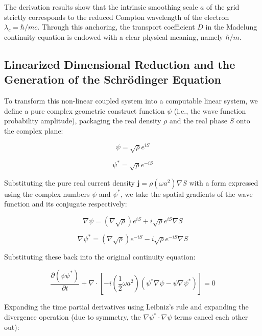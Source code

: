 \documentclass[12pt, a4paper]{article}
\begin{document}
The derivation results show that the intrinsic smoothing scale $a$ of the grid strictly corresponds to the reduced Compton wavelength of the electron $\lambda_c = \hbar/mc$. Through this anchoring, the transport coefficient $D$ in the Madelung continuity equation is endowed with a clear physical meaning, namely $\hbar/m$.

\subsection{Linearized Dimensional Reduction and the Generation of the Schrödinger Equation}

To transform this non-linear coupled system into a computable linear system, we define a pure complex geometric construct function $\psi$ (i.e., the wave function probability amplitude), packaging the real density $\rho$ and the real phase $S$ onto the complex plane:

\begin{equation}
\psi = \sqrt{\rho} e^{iS} 
\end{equation}

\begin{equation}
\psi^* = \sqrt{\rho} e^{-iS} 
\end{equation}

Substituting the pure real current density $\mathbf{j} = \rho (\omega a^2) \nabla S$ with a form expressed using the complex numbers $\psi$ and $\psi^*$, we take the spatial gradients of the wave function and its conjugate respectively:

\begin{equation}
\nabla \psi = (\nabla \sqrt{\rho}) e^{iS} + i \sqrt{\rho} e^{iS} \nabla S 
\end{equation}

\begin{equation}
\nabla \psi^* = (\nabla \sqrt{\rho}) e^{-iS} - i \sqrt{\rho} e^{-iS} \nabla S 
\end{equation}

Substituting these back into the original continuity equation:

\begin{equation}
\frac{\partial (\psi\psi^*)}{\partial t} + \nabla \cdot \left[ -i \left(\frac{1}{2}\omega a^2\right) (\psi^* \nabla \psi - \psi \nabla \psi^*) \right] = 0 
\end{equation}

Expanding the time partial derivatives using Leibniz's rule and expanding the divergence operation (due to symmetry, the $\nabla\psi^* \cdot \nabla\psi$ terms cancel each other out):
\end{document}
